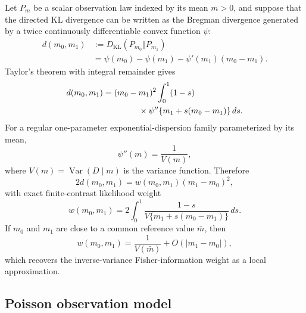 Let \(P_m\) be a scalar observation law indexed by its mean \(m>0\), and suppose that the directed KL divergence can be written as the Bregman divergence generated by a twice continuously differentiable convex function \(\psi\):
\begin{equation}
\begin{aligned}
d(m_0,m_1)
&:=
D_{\mathrm{KL}}(P_{m_0}\Vert P_{m_1})\\
&=
\psi(m_0)-\psi(m_1)-\psi'(m_1)(m_0-m_1).
\end{aligned}
\label{eq:S1-Bregman}
\end{equation}
Taylor's theorem with integral remainder gives
\begin{equation}
\begin{aligned}
d(m_0,m_1)
&=
(m_0-m_1)^2
\int_0^1
(1-s)\\
&\hspace{1.5cm}\times
\psi''\{m_1+s(m_0-m_1)\}\,ds .
\end{aligned}
\label{eq:S1-integral-remainder}
\end{equation}
For a regular one-parameter exponential-dispersion family parameterized by its mean,
\[
\psi''(m)=\frac{1}{V(m)},
\]
where \(V(m)=\operatorname{Var}(D\mid m)\) is the variance function. Therefore
\begin{equation}
2d(m_0,m_1)
=
w(m_0,m_1)(m_1-m_0)^2,
\label{eq:S1-scalar-weighted-form}
\end{equation}
with exact finite-contrast likelihood weight
\begin{equation}
w(m_0,m_1)
=
2\int_0^1
\frac{1-s}{V\{m_1+s(m_0-m_1)\}}\,ds.
\label{eq:S1-exact-weight}
\end{equation}
If \(m_0\) and \(m_1\) are close to a common reference value \(\bar m\), then
\[
w(m_0,m_1)=\frac{1}{V(\bar m)}+O(|m_1-m_0|),
\]
which recovers the inverse-variance Fisher-information weight as a local approximation.

\subsection{Poisson observation model}

